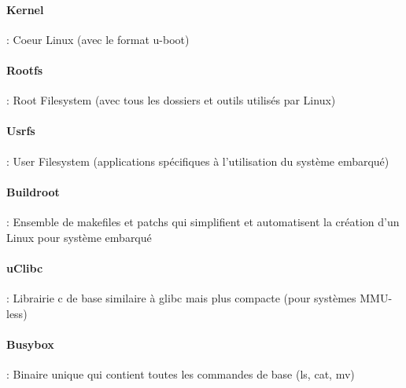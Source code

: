 \paragraph{Kernel} : Coeur Linux (avec le format u-boot)
\paragraph{Rootfs} : Root Filesystem (avec tous les dossiers et outils utilisés par Linux)
\paragraph{Usrfs} : User Filesystem (applications spécifiques à l'utilisation du système embarqué)
\paragraph{Buildroot} : Ensemble de makefiles et patchs qui simplifient et automatisent la création d'un Linux pour système embarqué
\paragraph{uClibc} : Librairie c de base similaire à glibc mais plus compacte (pour systèmes MMU-less)
\paragraph{Busybox} : Binaire unique qui contient toutes les commandes de base (ls, cat, mv)